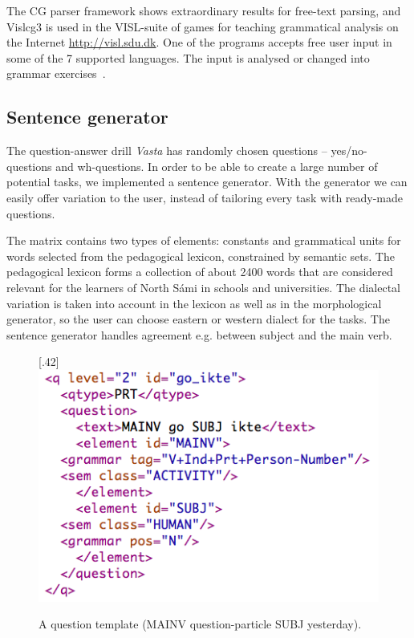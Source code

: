 \documentclass[11pt]{article}
\begin{document}
The CG parser framework shows extraordinary results for free-text parsing, and Vislcg3 is used in the VISL-suite of games for teaching grammatical analysis on the Internet \url{http://visl.sdu.dk}. One of the programs accepts free user input in some of the 7 supported languages. The input is analysed or changed into grammar exercises~\cite{Bick:05}.

\subsection{Sentence generator}
The question-answer drill \textit{Vasta} has randomly chosen questions -- yes/no-questions and wh-questions. In order to be able to create a large number of potential tasks, we implemented a sentence generator. With the generator we can easily offer variation to the user, instead of tailoring every task with ready-made questions.

The matrix contains two types of elements: constants and grammatical units for words selected from the pedagogical lexicon, constrained by semantic sets. The pedagogical lexicon forms a collection of about 2400 words that are considered relevant for the learners of North Sámi in schools and universities. The dialectal variation is taken into account in the lexicon as well as in the morphological generator, so the user can choose eastern or western dialect for the tasks. The sentence generator handles agreement e.g. between subject and the main verb. \\ 

\begin{figure}[htbp]
\begin{center}
\scalebox{.42}[.42]{\includegraphics{presentation/img/sentencegenerator.png}}\\
\caption{A question template (MAINV question-particle SUBJ yesterday).}
\label{sentgen}
\end{center}
\end{figure}
\end{document}
